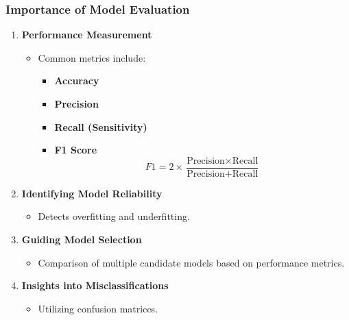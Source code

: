 \documentclass[aspectratio=169]{beamer}
\begin{document}
\begin{frame}[fragile]
    \frametitle{Importance of Model Evaluation}

    \begin{enumerate}
        \item \textbf{Performance Measurement}
        \begin{itemize}
            \item Common metrics include:
            \begin{itemize}
                \item \textbf{Accuracy}
                \item \textbf{Precision}
                \item \textbf{Recall (Sensitivity)}
                \item \textbf{F1 Score}
                \begin{equation}
                F1 = 2 \times \frac{{\text{Precision} \times \text{Recall}}}{{\text{Precision} + \text{Recall}}}
                \end{equation}
            \end{itemize}
        \end{itemize}

        \item \textbf{Identifying Model Reliability}
        \begin{itemize}
            \item Detects overfitting and underfitting.
        \end{itemize}

        \item \textbf{Guiding Model Selection}
        \begin{itemize}
            \item Comparison of multiple candidate models based on performance metrics.
        \end{itemize}

        \item \textbf{Insights into Misclassifications}
        \begin{itemize}
            \item Utilizing confusion matrices.
        \end{itemize}
    \end{enumerate}
\end{frame}
\end{document}
